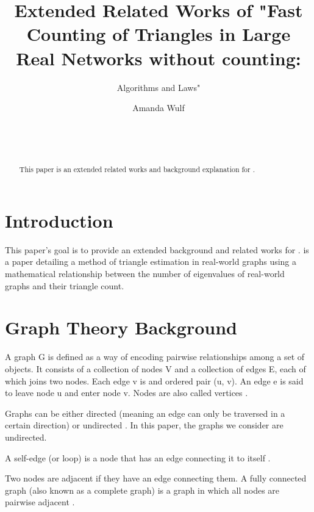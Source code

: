 \documentclass{acm_proc_article-sp}
\begin{document}
\title{Extended Related Works of "Fast Counting of Triangles in Large Real Networks without counting:}
\subtitle{Algorithms and Laws"}

\author{
\alignauthor
Amanda Wulf\\
       \\
       \\
       \\
}

\maketitle
\begin{abstract}
This paper is an extended related works and background explanation for
\cite{original}.
\end{abstract}

\section{Introduction}
This paper's goal is to provide an extended background and related works for
\cite{original}. \cite{original} is a paper detailing a method of triangle
estimation in real-world graphs using a mathematical relationship between the
number of eigenvalues of real-world graphs and their triangle count.

\section{Graph Theory Background}
A graph G is defined as a way of encoding pairwise relationships among a set of
objects. It consists of a collection of nodes V and a collection of edges E, each
of which joins two nodes. Each edge v is and ordered pair (u, v). An edge e is
said to leave node u and enter node v. Nodes are also called vertices
\cite{kleinberg}.

Graphs can be either directed (meaning an edge can only be traversed in a
certain direction) or undirected \cite{kleinberg}. In this paper, the graphs we
consider are undirected.

A self-edge (or loop) is a node that has an edge connecting it to itself
\cite{diestel}.

Two nodes are adjacent if they have an edge connecting them. A fully
connected graph (also known as a complete graph) is a graph in which all
nodes are pairwise adjacent \cite{diestel}.
\end{document}
